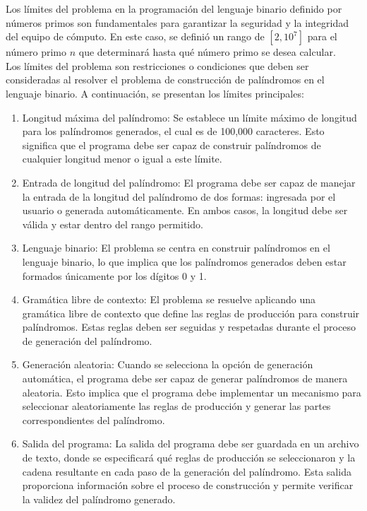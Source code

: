 Los límites del problema en la programación del lenguaje binario definido por números primos son fundamentales para garantizar la seguridad y la integridad del equipo de cómputo. En este caso, se definió un rango de $[2, 10^7]$ para el número primo $n$ que determinará hasta qué número primo se desea calcular.\newline
\\
Los límites del problema son restricciones o condiciones que deben ser consideradas al resolver el problema de construcción de palíndromos en el lenguaje binario. A continuación, se presentan los límites principales:\newline
\begin{enumerate}

\item Longitud máxima del palíndromo: Se establece un límite máximo de longitud para los palíndromos generados, el cual es de 100,000 caracteres. Esto significa que el programa debe ser capaz de construir palíndromos de cualquier longitud menor o igual a este límite.\newline

\item Entrada de longitud del palíndromo: El programa debe ser capaz de manejar la entrada de la longitud del palíndromo de dos formas: ingresada por el usuario o generada automáticamente. En ambos casos, la longitud debe ser válida y estar dentro del rango permitido.\newline

\item Lenguaje binario: El problema se centra en construir palíndromos en el lenguaje binario, lo que implica que los palíndromos generados deben estar formados únicamente por los dígitos 0 y 1.\newline

\item Gramática libre de contexto: El problema se resuelve aplicando una gramática libre de contexto que define las reglas de producción para construir palíndromos. Estas reglas deben ser seguidas y respetadas durante el proceso de generación del palíndromo.\newline

\item Generación aleatoria: Cuando se selecciona la opción de generación automática, el programa debe ser capaz de generar palíndromos de manera aleatoria. Esto implica que el programa debe implementar un mecanismo para seleccionar aleatoriamente las reglas de producción y generar las partes correspondientes del palíndromo.\newline

\item Salida del programa: La salida del programa debe ser guardada en un archivo de texto, donde se especificará qué reglas de producción se seleccionaron y la cadena resultante en cada paso de la generación del palíndromo. Esta salida proporciona información sobre el proceso de construcción y permite verificar la validez del palíndromo generado.\newline
\end{enumerate}



